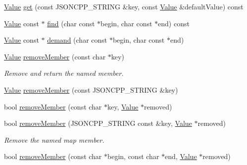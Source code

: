 \begin{DoxyCompactItemize}
\item 
\hyperlink{classJson_1_1Value}{Value} \hyperlink{classJson_1_1Value_a0d143ddad13c005d123ab30a22dbd521}{get} (const J\+S\+O\+N\+C\+P\+P\+\_\+\+S\+T\+R\+I\+NG \&key, const \hyperlink{classJson_1_1Value}{Value} \&default\+Value) const 
\item 
\hyperlink{classJson_1_1Value}{Value} const $\ast$ \hyperlink{classJson_1_1Value_a184bf49ec5da7ec31af089cf6f458f99}{find} (char const $\ast$begin, char const $\ast$end) const 
\item 
\hyperlink{classJson_1_1Value}{Value} const $\ast$ \hyperlink{classJson_1_1Value_afeb7ff596a0929d90c5f2f3cffb413ed}{demand} (char const $\ast$begin, char const $\ast$end)
\item 
\hyperlink{classJson_1_1Value}{Value} \hyperlink{classJson_1_1Value_aa52f7873b95d29627d6e83ba96f69aaa}{remove\+Member} (const char $\ast$key)
\begin{DoxyCompactList}\small\item\em Remove and return the named member. \end{DoxyCompactList}\item 
\hyperlink{classJson_1_1Value}{Value} \hyperlink{classJson_1_1Value_a1dfd5d30fbc53fcd9c4955b8b3e7885c}{remove\+Member} (const J\+S\+O\+N\+C\+P\+P\+\_\+\+S\+T\+R\+I\+NG \&key)
\item 
bool \hyperlink{classJson_1_1Value_a708e599489adf30d65bf85a8ee16e6fb}{remove\+Member} (const char $\ast$key, \hyperlink{classJson_1_1Value}{Value} $\ast$removed)
\item 
bool \hyperlink{classJson_1_1Value_ae385ecef98427970df525ee876e9f54a}{remove\+Member} (J\+S\+O\+N\+C\+P\+P\+\_\+\+S\+T\+R\+I\+NG const \&key, \hyperlink{classJson_1_1Value}{Value} $\ast$removed)
\begin{DoxyCompactList}\small\item\em Remove the named map member. \end{DoxyCompactList}\item 
bool \hyperlink{classJson_1_1Value_a49c91af727d6b4eb0af02a81bb2def87}{remove\+Member} (const char $\ast$begin, const char $\ast$end, \hyperlink{classJson_1_1Value}{Value} $\ast$removed)\hypertarget{classJson_1_1Value_a49c91af727d6b4eb0af02a81bb2def87}{}\label{classJson_1_1Value_a49c91af727d6b4eb0af02a81bb2def87}


\end{DoxyCompactItemize}
